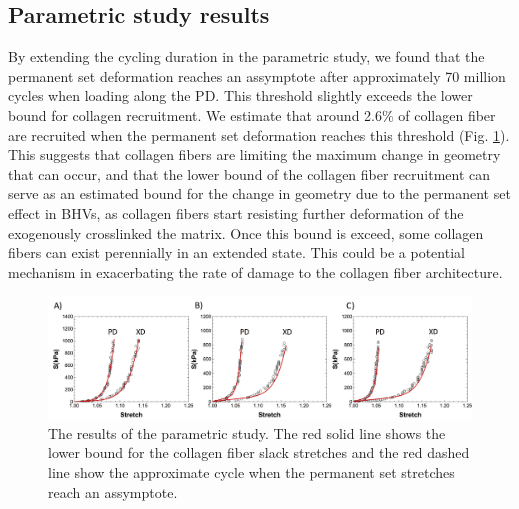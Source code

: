 \subsection{Parametric study results}
	By extending the cycling duration in the parametric study, we found that the permanent set deformation reaches an assymptote after approximately 70 million cycles when loading along the PD. 
	This threshold slightly exceeds the lower bound for collagen recruitment. 
	We estimate that around 2.6\% of collagen fiber are recruited when the permanent set deformation reaches this threshold (Fig. \ref{fig:parametric}). 
	This suggests that collagen fibers are limiting the maximum change in geometry that can occur, and that the lower bound of the collagen fiber recruitment can serve as an estimated bound for the change in geometry due to the permanent set effect in BHVs, as collagen fibers start resisting further deformation of the exogenously crosslinked the matrix. Once this bound is exceed, some collagen fibers can exist perennially in an extended state. This could be a potential mechanism in exacerbating the rate of damage to the collagen fiber architecture. 

\begin{figure}[hbt]
\centering
\includegraphics[width=0.35\paperwidth]{Images/chapter4/figure16}
\caption{The results of the parametric study. The red solid line shows the lower bound for the collagen fiber slack stretches and the red dashed line show the approximate cycle when the permanent set stretches reach an assymptote.}
\label{fig:parametric}
\end{figure}